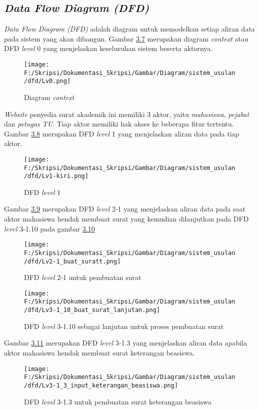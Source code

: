 \subsection{\textit{Data Flow Diagram (DFD)}}
\label{sec:data_flow_diagram}
\textit{Data Flow Diagram (DFD)} adalah diagram untuk memodelkan setiap aliran data pada sistem yang akan dibangun.
Gambar \hyperlink{data_flow}{3.7} merupakan diagram \textit{context} atau DFD \textit{level} 0 yang menjelaskan 
keseluruhan sistem beserta aktornya.

\begin{figure}[H]
	\centering
		\texttt{[image: F:/Skripsi/Dokumentasi\_Skripsi/Gambar/Diagram/sistem\_usulan/dfd/Lv0.png]}
	\caption{Diagram \textit{context}}
	\label{fig:data_flow}
\end{figure}

\textit{Website} penyedia surat akademik ini memiliki 3 aktor, yaitu \textit{mahasiswa}, \textit{pejabat} dan \textit{petugas TU}. Tiap aktor memiliki hak akses ke beberapa fitur tertentu. Gambar \hyperlink{level_1}{3.8} merupakan DFD \textit{level} 1 yang menjelaskan aliran data pada tiap aktor.

\begin{figure}[H]
	\centering
		\texttt{[image: F:/Skripsi/Dokumentasi\_Skripsi/Gambar/Diagram/sistem\_usulan/dfd/Lv1-kiri.png]}
	\caption{DFD \textit{level} 1}
	\label{fig:level_1}
\end{figure}

Gambar \hyperlink{level_2-1}{3.9} merupakan DFD \textit{level} 2-1 yang menjelaskan aliran data pada saat aktor mahasiswa hendak membuat surat yang kemudian dilanjutkan pada DFD \textit{level} 3-1.10 pada gambar \hyperlink{level_3-1.10}{3.10}

\begin{figure}[H]
	\centering
		\texttt{[image: F:/Skripsi/Dokumentasi\_Skripsi/Gambar/Diagram/sistem\_usulan/dfd/Lv2-1\_buat\_suratt.png]}
	\caption{DFD \textit{level} 2-1 untuk pembuatan surat}
	\label{fig:level_2-1}
\end{figure}

\begin{figure}[H]
	\centering
		\texttt{[image: F:/Skripsi/Dokumentasi\_Skripsi/Gambar/Diagram/sistem\_usulan/dfd/Lv3-1\_10\_buat\_surat\_lanjutan.png]}
	\caption{DFD \textit{level} 3-1.10 sebagai lanjutan untuk proses pembuatan surat}
	\label{fig:level_3-1.10}
\end{figure}

Gambar \hyperlink{level_3-1.3}{3.11} merupakan DFD \textit{level} 3-1.3 yang menjelaskan aliran data apabila aktor mahasiswa hendak membuat surat keterangan beasiswa.
\begin{figure}[H]
	\centering
		\texttt{[image: F:/Skripsi/Dokumentasi\_Skripsi/Gambar/Diagram/sistem\_usulan/dfd/Lv3-1\_3\_input\_keterangan\_beasiswa.png]}
	\caption{DFD \textit{level} 3-1.3 untuk pembuatan surat keterangan beasiswa}
	\label{fig:level_3-1.3}
\end{figure}

